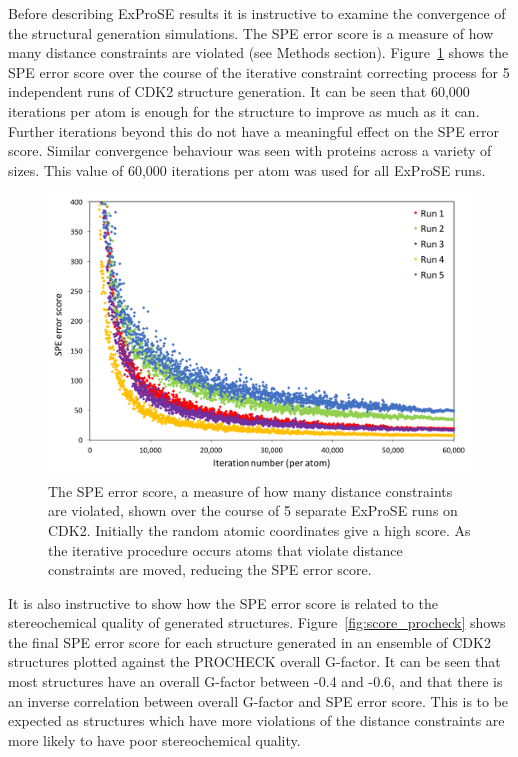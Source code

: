 Before describing ExProSE results it is instructive to examine the convergence of the structural generation simulations.
The SPE error score is a measure of how many distance constraints are violated (see Methods section).
Figure~\ref{fig:spe_convergence} shows the SPE error score over the course of the iterative constraint correcting process for 5 independent runs of CDK2 structure generation.
It can be seen that 60,000 iterations per atom is enough for the structure to improve as much as it can.
Further iterations beyond this do not have a meaningful effect on the SPE error score.
Similar convergence behaviour was seen with proteins across a variety of sizes.
This value of 60,000 iterations per atom was used for all ExProSE runs.


\begin{figure}
\centering

\includegraphics[width=\textwidth]{figures/spe_convergence/spe_convergence}

\caption{The SPE error score, a measure of how many distance constraints are violated, shown over the course of 5 separate ExProSE runs on CDK2.
Initially the random atomic coordinates give a high score.
As the iterative procedure occurs atoms that violate distance constraints are moved, reducing the SPE error score.}

\label{fig:spe_convergence}
\end{figure}


It is also instructive to show how the SPE error score is related to the stereochemical quality of generated structures.
Figure~\ref{fig:score_procheck} shows the final SPE error score for each structure generated in an ensemble of CDK2 structures plotted against the PROCHECK overall G-factor.
It can be seen that most structures have an overall G-factor between -0.4 and -0.6, and that there is an inverse correlation between overall G-factor and SPE error score.
This is to be expected as structures which have more violations of the distance constraints are more likely to have poor stereochemical quality.



